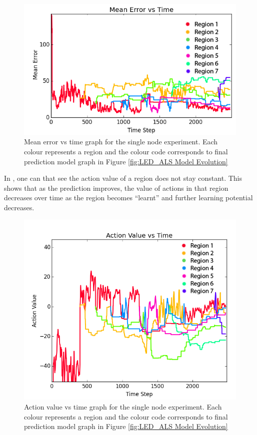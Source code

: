 \begin{figure}  [!htbp]
	\centering
	\includegraphics[width=1.0\textwidth]{"fig/validations/LED_ALS Mean Error vs Time"}
	\caption[Mean error vs time graph for the single node experiment]{Mean error vs time graph for the single node experiment. Each colour represents a region and the colour code corresponds to final prediction model graph in Figure \ref{fig:LED_ALS Model Evolution} }
	\label{fig:LED_ALS Mean Error vs Time}
\end{figure}


In , one can that see the action value of a region does not stay constant. This shows that as the prediction improves, the value of actions in that region decreases over time as the region becomes “learnt” and further learning potential decreases. 

\begin{figure} [!htbp]
	\centering
	\includegraphics[width=1.0\textwidth]{"fig/validations/LED_ALS Action Value vs Time"}
	\caption[Action value vs time graph for the single node experiment]{Action value vs time graph for the single node experiment. Each colour represents a region and the colour code corresponds to final prediction model graph in Figure \ref{fig:LED_ALS Model Evolution} }
	\label{fig:LED_ALS Action Value vs Time}
\end{figure}

